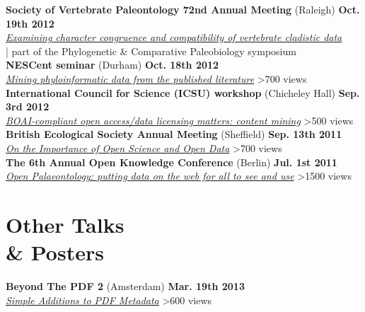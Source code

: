 \documentclass[margin,line]{resume}
\begin{document}
\begin{resume}
\vspace{-7 mm}     
\textbf{Society of Vertebrate Paleontology 72nd Annual Meeting} (Raleigh) \hfill \textbf{Oct. 19th 2012}\\
    \textsl{\href{http://prezi.com/4vwe4togkazh/svp2012/}{Examining character congruence and compatibility of vertebrate cladistic data}} \\ | part of the Phylogenetic \& Comparative Paleobiology symposium\\ 

\vspace{-7 mm} 
\textbf{NESCent seminar} (Durham) \hfill \textbf{Oct. 18th 2012}\\
    \textsl{\href{http://prezi.com/k0xq0fmcfu7x/nescent-seminar-on-open-content-mining-for-phyloinformatic-data/}{Mining phyloinformatic data from the published literature}} \hfill {\color{red} 		\textgreater 700 views}\\

\vspace{-7 mm} 
 \textbf{International Council for Science (ICSU) workshop} (Chicheley Hall) \hfill \textbf{Sep. 3rd 2012}\\
    \textsl{\href{http://prezi.com/pdq4v-hhcc_2/boai-compliant-open-access-content-mining/}{BOAI-compliant open access/data licensing matters: content mining}} \hfill {\color{red} 		\textgreater 500 views}\\

\vspace{-7 mm}
     \textbf{British Ecological Society Annual Meeting} (Sheffield) \hfill \textbf{Sep. 13th 2011}\\
    \textsl{\href{http://prezi.com/jpr3ltvez2d8/on-the-importance-of-open-science-and-open-data/}{On the Importance of Open Science and Open Data}} \hfill {\color{red} 		\textgreater 700 views}\\

\vspace{-7 mm} 
    \textbf{The 6th Annual Open Knowledge Conference} (Berlin) \hfill \textbf{Jul. 1st 2011}\\
    \textsl{\href{http://prezi.com/d9yztcafx_ag/open-palaeontology/}{Open Palaeontology: putting data on the web for all to see and use}} \hfill {\color{red} 		\textgreater 1500 views}
\newpage
    \section{\mysidestyle Other Talks\\ \&  Posters}
 \textbf{Beyond The PDF 2} (Amsterdam) \hfill \textbf{Mar. 19th 2013}\\
    \textsl{\href{http://www.slideshare.net/rossmounce/simple-additions-to-metadata}{Simple Additions to PDF Metadata}} \hfill {\color{red} 		\textgreater 600 views}\\


\end{resume}
\end{document}

